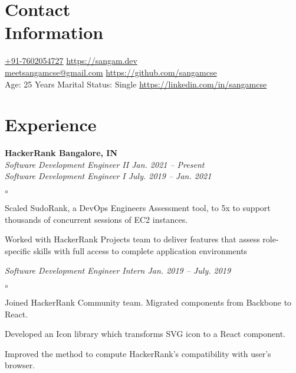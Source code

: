 \documentclass[margin,line]{resume}
\begin{document}
\begin{resume}
    \section{\mysidestyle Contact\\Information}
    \href{tel:+917602054727}{+91-7602054727}                                      \hfill    \url{https://sangam.dev}\\%
    \href{mailto:meetsangamcse@gmail.com}{meetsangamcse@gmail.com}      \hfill    \url{https://github.com/sangamcse}\\%
    Age: 25 Years           \hfill      Marital Status: Single       \hfill    \url{https://linkedin.com/in/sangamcse}%

    \section{\mysidestyle Experience}

    \textbf{HackerRank                                                                     \hfill    Bangalore, IN} \\%
    \emph{Software Development Engineer II                                          \hfill    Jan. 2021 -- Present} \\%
    \emph{Software Development Engineer I                                           \hfill    July. 2019 -- Jan. 2021}%
    \begin{list}{$\circ$}{}
        \item Scaled SudoRank, a DevOps Engineers Assessment tool, to 5x to support thousands of concurrent sessions of
              EC2 instances.
        \item Worked with HackerRank Projects team to deliver features that assess role-specific skills with full     %
              access to complete application environments
    \end{list}
    \emph{Software Development Engineer Intern                                      \hfill    Jan. 2019 -- July. 2019}%
    \begin{list}{$\circ$}{}
        \item Joined HackerRank Community team. Migrated components from Backbone to React.
        \item Developed an Icon library which transforms SVG icon to a React component.
        \item Improved the method to compute HackerRank's compatibility with user's browser.
    \end{list}


\end{resume}
\end{document}
